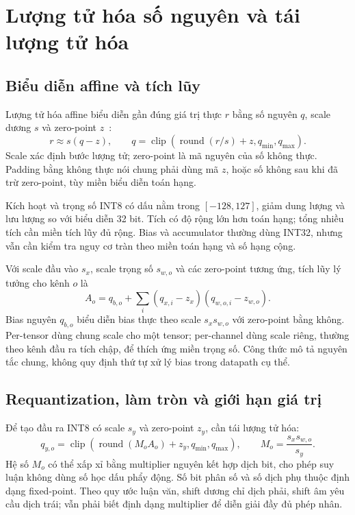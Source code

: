 \section{Lượng tử hóa số nguyên và tái lượng tử hóa}
\subsection{Biểu diễn affine và tích lũy}
Lượng tử hóa affine biểu diễn gần đúng giá trị thực $r$ bằng số nguyên $q$, scale dương $s$ và zero-point $z$~\cite{jacob2018quantization}:
\begin{equation}
 r\approx s(q-z),\qquad q=\operatorname{clip}\!\left(\operatorname{round}(r/s)+z,q_{\min},q_{\max}\right).
\end{equation}
Scale xác định bước lượng tử; zero-point là mã nguyên của số không thực. Padding bằng không thực nói chung phải dùng mã $z$, hoặc số không sau khi đã trừ zero-point, tùy miền biểu diễn toán hạng.

Kích hoạt và trọng số INT8 có dấu nằm trong $[-128,127]$, giảm dung lượng và lưu lượng so với biểu diễn 32 bit. Tích có độ rộng lớn hơn toán hạng; tổng nhiều tích cần miền tích lũy đủ rộng. Bias và accumulator thường dùng INT32, nhưng vẫn cần kiểm tra nguy cơ tràn theo miền toán hạng và số hạng cộng.

Với scale đầu vào $s_x$, scale trọng số $s_{w,o}$ và các zero-point tương ứng, tích lũy lý tưởng cho kênh $o$ là
\begin{equation}
 A_o=q_{b,o}+\sum_i(q_{x,i}-z_x)(q_{w,o,i}-z_{w,o}).
\end{equation}
Bias nguyên $q_{b,o}$ biểu diễn bias thực theo scale $s_xs_{w,o}$ với zero-point bằng không. Per-tensor dùng chung scale cho một tensor; per-channel dùng scale riêng, thường theo kênh đầu ra tích chập, để thích ứng miền trọng số. Công thức mô tả nguyên tắc chung, không quy định thứ tự xử lý bias trong datapath cụ thể.

\subsection{Requantization, làm tròn và giới hạn giá trị}
Để tạo đầu ra INT8 có scale $s_y$ và zero-point $z_y$, cần tái lượng tử hóa:
\begin{equation}
 q_{y,o}=\operatorname{clip}\!\left(\operatorname{round}(M_oA_o)+z_y,q_{\min},q_{\max}\right),
 \qquad M_o=\frac{s_xs_{w,o}}{s_y}.
\end{equation}
Hệ số $M_o$ có thể xấp xỉ bằng multiplier nguyên kết hợp dịch bit, cho phép suy luận không dùng số học dấu phẩy động. Số bit phân số và số dịch phụ thuộc định dạng fixed-point. Theo quy ước luận văn, shift dương chỉ dịch phải, shift âm yêu cầu dịch trái; vẫn phải biết định dạng multiplier để diễn giải đầy đủ phép nhân.

